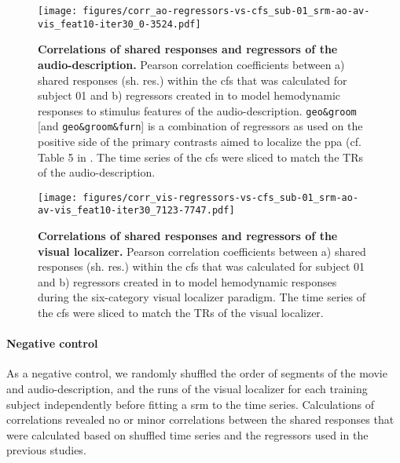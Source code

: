 \begin{figure*}[tbp]
\centering
    \texttt{[image: figures/corr\_ao-regressors-vs-cfs\_sub-01\_srm-ao-av-vis\_feat10-iter30\_0-3524.pdf]}
    \caption{
    \textbf{Correlations of shared responses and regressors of the audio-description.}
    Pearson correlation coefficients between a) shared responses (sh. res.)
    within the \ac{cfs} that was calculated for subject 01 and b) regressors
    created in \citet{haeusler2022processing} to model hemodynamic responses to
    stimulus features of the audio-description.
    \texttt{geo\&groom} [and \texttt{geo\&groom\&furn}] is a combination of
    regressors as used on the positive side of the primary contrasts aimed to
    localize the \ac{ppa} (cf. Table 5 in \citet{haeusler2022processing}.
    The time series of the \ac{cfs} were sliced to match the TRs of the
    audio-description.
    }
    \label{fig:corr-ao-reg-srm}
\end{figure*}



\begin{figure*}[tbp]
\centering
\texttt{[image: figures/corr\_vis-regressors-vs-cfs\_sub-01\_srm-ao-av-vis\_feat10-iter30\_7123-7747.pdf]}
    \caption{
    \textbf{Correlations of shared responses and regressors of the visual
    localizer.
    }
    Pearson correlation coefficients between a) shared responses (sh. res.)
    within the \ac{cfs} that was calculated for subject 01 and b) regressors
    created in \citet{sengupta2016extension} to model hemodynamic responses
    during the six-category visual localizer paradigm.
    The time series of the \ac{cfs} were sliced to match the TRs of the
    visual localizer.
}
    \label{fig:corr-vis-reg-srm}
\end{figure*}



\paragraph{Negative control}
As a negative control, we randomly shuffled the order of segments of the movie
and audio-description, and the runs of the visual localizer for each training
subject independently before fitting a \ac{srm} to the time series.
Calculations of correlations revealed no or minor correlations between the
shared responses that were calculated based on shuffled time series and the
regressors used in the previous studies.


